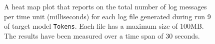 \begin{figure}[htbp]
\centering
\begin{minipage}{1\textwidth}
  \centering
\end{minipage}
\caption{A heat map plot that reports on the total number of log messages per time unit (milliseconds) for each log file generated during run 9 of target model \texttt{Tokens}. Each file has a maximum size of 100MB. The results have been measured over a time span of 30 seconds.}
\label{figure:throughput_sum_tokens_9}
\end{figure}